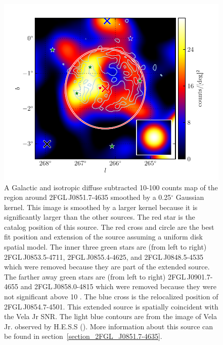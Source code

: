 \documentclass[12pt,preprint]{aastex}
\newcommand{\gev}{\text{GeV}\xspace}
\newcommand{\tev}{\text{TeV}\xspace}
\renewcommand{\deg}{\ensuremath{^\circ}\xspace}
\begin{document}
\begin{figure}
  \begin{center}
    \includegraphics[type=pdf,ext=.pdf,read=.pdf]{source_plots/source_Vela_Jr}
  \end{center}
  \caption{A Galactic and isotropic diffuse subtracted 10-100
  \gev counts map of the region around 2FGL\,J0851.7-4635 smoothed
  by a 0.25\deg Gaussian kernel. This image is smoothed by a larger
  kernel because it is significantly larger than the other sources.
  The red star is the catalog position of this source.  The red cross
  and circle are the best fit position and extension of the source
  assuming a uniform disk spatial model.  The inner three green stars
  are (from left to right) 2FGL\,J0853.5-4711, 2FGL\,J0855.4-4625,
  and 2FGL\,J0848.5-4535 which were removed because they are part of
  the extended source.  The farther away green stars are (from left to
  right) 2FGL\,J0901.7-4655 and 2FGL\,J0858.0-4815 which were removed
  because they were not significant above 10 \gev.  The blue cross
  is the relocalized position of 2FGL\,J0854.7-4501.  This extended
  source is spatially coincident with the Vela Jr SNR.  The light
  blue contours are from the \tev image of Vela Jr. observed by H.E.S.S
  (\cite{vela_jr_hess}).  More information about this source can be
  found in section~\ref{section_2FGL_J0851.7-4635}.
  }\label{Vela_Jr}
\end{figure}
\end{document}
